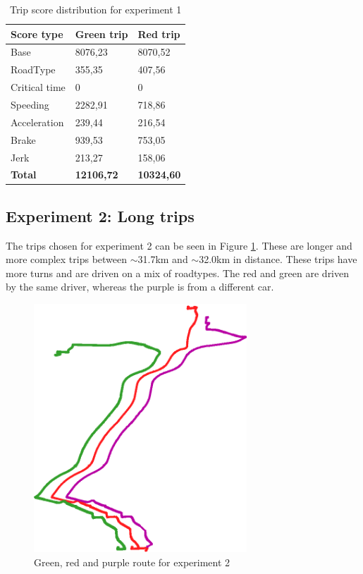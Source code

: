 \begin{table}
    \centering
    \begin{tabular}{lll}
    \textbf{Score type} & \textbf{Green trip} & \textbf{Red trip} \\ \hline
    Base                & 8076,23             & 8070,52           \\
    RoadType            & 355,35              & 407,56            \\
    Critical time       & 0                   & 0                 \\
    Speeding            & 2282,91             & 718,86            \\
    Acceleration        & 239,44              & 216,54            \\
    Brake               & 939,53              & 753,05            \\
    Jerk                & 213,27              & 158,06            \\ \hline
    \textbf{Total}      & \textbf{12106,72}   & \textbf{10324,60} \\ \hline
    \end{tabular}
    \caption{Trip score distribution for experiment 1}
    \label{tab:shorttripscores}
\end{table}

\subsection{Experiment 2: Long trips} \label{subsec:expe2}
The trips chosen for experiment 2 can be seen in Figure \ref{fig:longtrips}. These are longer and more complex trips between $\sim$31.7km and $\sim$32.0km in distance. These trips have more turns and are driven on a mix of roadtypes. The red and green are driven by the same driver, whereas the purple is from a different car.

\begin{figure}[tb]
    \centering
    \includegraphics[width=80mm]{Pictures/LongTrips.png}
    \caption{Green, red and purple route for experiment 2}
    \label{fig:longtrips}
\end{figure}

